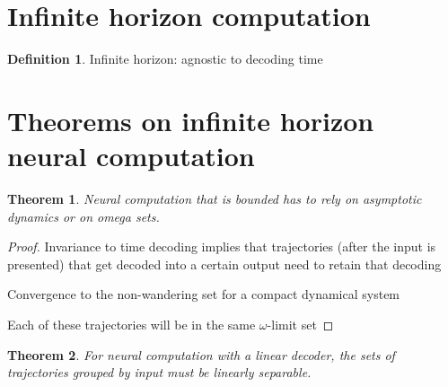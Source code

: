\documentclass{article}
\title{}
\author{\'Abel S\'agodi}
\date{September 1, 2023}
\newtheorem{theorem}{Theorem}
\theoremstyle{definition}
\newtheorem{definition}{Definition}
\theoremstyle{remark}
\begin{document}
\maketitle

\section{Infinite horizon computation}	
\begin{definition}
Infinite horizon: agnostic to decoding time
\end{definition}

\section{Theorems on infinite horizon neural computation}
\begin{theorem}
Neural computation that is bounded has to rely on asymptotic dynamics or on omega sets.
\end{theorem}

\begin{proof}
Invariance to time decoding implies that trajectories (after the input is presented) that get decoded into a certain output need to retain that decoding

Convergence to the non-wandering set for a compact dynamical system

Each of these trajectories will be in the same $\omega$-limit set
\end{proof}




\begin{theorem}
For neural computation with a linear decoder, the sets of trajectories grouped by input must be linearly separable.
\end{theorem}


% 
% 
\end{document}
